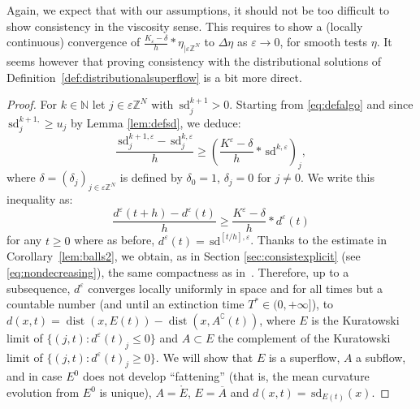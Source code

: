 \documentclass[10pt]{amsart}
\theoremstyle{plain}
\theoremstyle{definition}
\newcommand{\Z}{\mathbb{Z}}
\newcommand{\N}{\mathbb{N}}
\newcommand{\comp}[1]{{#1}^\complement}
\DeclareMathOperator{\dist}{dist}
\newcommand{\e}{\varepsilon}
\newcommand{\sd}{\,\mathrm{sd}}
\newcommand{\ez}{\e\Z^N}
\numberwithin{equation}{section}
\begin{document}
Again, we expect that with our assumptions, it should not be
too difficult to show consistency in the viscosity sense. This requires
to show a (locally continuous) convergence of $\frac{K_\e-\delta}{h}*\eta_{|\e\Z^N}$
to $\Delta\eta$ as $\e\to 0$, for smooth tests $\eta$.
It seems however that proving consistency with the distributional solutions of Definition~\ref{def:distributionalsuperflow}
is a bit more direct.
\begin{proof}
  {For $k\in\N$ let $j\in\ez$ with $\sd^{k+1}_j>0$. Starting from    \eqref{eq:defalgo} and  since $\sd^{k+1,}_j\ge u_j$  by Lemma \ref{lem:defsd}, we deduce:}
\[
  \frac{\sd^{k+1,\e}_j-\sd^{k,\e}_j}{h} \ge \left(\frac{K^\e- \delta}{h}*\sd^{k,\e}\right)_j,
\]
where $\delta = (\delta_j)_{j\in\e\Z^N}$ is defined by $\delta_0=1$,
$\delta_j=0$ for $j\neq 0$. We write this inequality as:
\[
  \frac{d^{\e}(t+h)-d^{\e}(t)}{h} \ge \frac{K^\e- \delta}{h}*d^{\e}(t)
\]
for any $t\ge 0$ where as before, $d^\e(t) = \sd^{[t/h],\e}$.
Thanks to the estimate in Corollary~\ref{lem:balls2}, we obtain,
as in Section \ref{sec:consistexplicit} (see \eqref{eq:nondecreasing}), the same compactness
as in~\cite[Prop.~4.4]{CMP17}. Therefore, up to a subsequence,  $d^\e$ converges
locally uniformly in space and for all times but a countable number (and until an extinction time $T^*\in (0,+\infty]$), to
$d(x,t)=\dist(x,E(t))-\dist(x,\comp{A}(t))$, where $E$ is the Kuratowski limit of $\{(j,t): d^\e(t)_j\le 0\}$
and ${A}\subset E$ the complement of the Kuratowski limit of $\{(j,t): d^\e(t)_j\ge 0\}$. We will show that $E$ is a superflow,
${A}$ a subflow, and in case $E^0$ does not develop ``fattening'' (that is, the mean
curvature evolution from $E^0$ is unique), $A = \mathring{E}$, $E=\overline{A}$ and
$d(x,t)=\sd_{E(t)}(x)$.


\end{proof}
\end{document}
